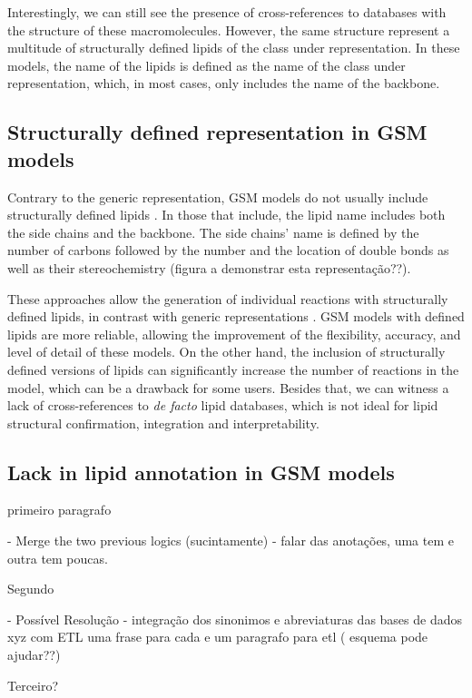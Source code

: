 \documentclass{llncs}
\begin{document}
Interestingly, we can still see the presence of cross-references to databases with the structure of these macromolecules. However, the same structure represent a multitude of structurally defined lipids of the class under representation. In these models, the name of the lipids is defined as the name of the class under representation, which, in most cases, only includes the name of the backbone.

\subsection{Structurally defined representation in GSM models}
Contrary to the generic representation, GSM models do not usually include structurally defined lipids \cite{Schutzhold}.
In those that include, the lipid name includes both the side chains and the backbone. The side chains' name is defined by the number of carbons followed by the number and the location of double bonds as well as their stereochemistry (figura a demonstrar esta representação??).

These approaches allow the generation of individual reactions with structurally defined lipids, in contrast with generic representations \cite{Aung2013}.
GSM models with defined lipids are more reliable, allowing the improvement of the flexibility, accuracy, and level of detail of these models. On the other hand, the inclusion of structurally defined versions of lipids can significantly increase the number of reactions in the model, which can be a drawback for some users.
Besides that, we can witness a lack of cross-references to \textit{de facto} lipid databases, which is not ideal for lipid structural confirmation, integration and interpretability.

\subsection{Lack in lipid annotation in GSM models}
primeiro paragrafo

- Merge the two previous logics (sucintamente)
- falar das anotações, uma tem e outra tem poucas.

Segundo

- Possível Resolução
    - integração dos sinonimos e abreviaturas das bases de dados xyz com ETL
    uma frase para cada e um paragrafo para etl ( esquema pode ajudar??)

Terceiro?   
\end{document}
